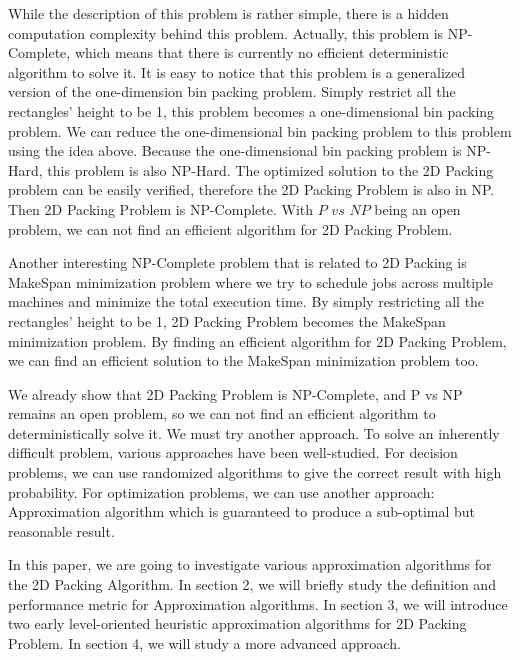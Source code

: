 \documentclass[sigplan,screen,nonacm]{acmart}\settopmatter{printfolios=true,printccs=false,printacmref=false}
\begin{document}
While the description of this problem is rather simple, there is a hidden computation complexity behind this problem. Actually, this problem is NP-Complete\cite{hartmanis1982computers}, which means that there is currently no efficient deterministic algorithm to solve it. It is easy to notice that this problem is a generalized version of the one-dimension bin packing problem\cite{johnson1974worst}. Simply restrict all the rectangles' height to be 1, this problem becomes a one-dimensional bin packing problem. We can reduce the one-dimensional bin packing problem to this problem using the idea above. Because the one-dimensional bin packing problem is NP-Hard, this problem is also NP-Hard. The optimized solution to the 2D Packing problem can be easily verified, therefore the 2D Packing Problem is also in NP. Then 2D Packing Problem is NP-Complete. With $P$ $vs$ $NP$ being an open problem, we can not find an efficient algorithm for 2D Packing Problem. \par
Another interesting NP-Complete problem that is related to 2D Packing is MakeSpan minimization problem\cite{graham1966bounds} where we try to schedule jobs across multiple machines and minimize the total execution time. By simply restricting all the rectangles' height to be 1, 2D Packing Problem becomes the MakeSpan minimization problem. By finding an efficient algorithm for 2D Packing Problem, we can find an efficient solution to the MakeSpan minimization problem too. \par
We already show that 2D Packing Problem is NP-Complete, and P vs NP remains an open problem, so we can not find an efficient algorithm to deterministically solve it. We must try another approach. To solve an inherently difficult problem, various approaches have been well-studied. For decision problems, we can use randomized algorithms to give the correct result with high probability. For optimization problems, we can use another approach: Approximation algorithm\cite{garey1976approximation} which is guaranteed to produce a sub-optimal but reasonable result. \par
In this paper, we are going to investigate various approximation algorithms for the 2D Packing Algorithm. In section 2, we will briefly study the definition and performance metric for Approximation algorithms. In section 3, we will introduce two early level-oriented heuristic approximation algorithms\cite{coffman1980performance} for 2D Packing Problem. In section 4,  we will study a more advanced approach\cite{steinberg1997strip}.
\end{document}
